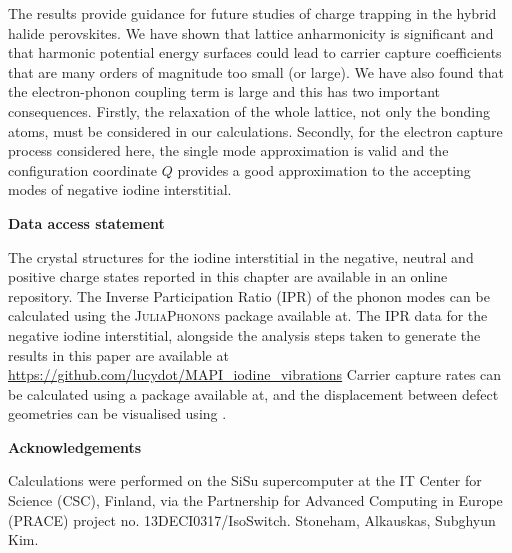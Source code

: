 The results provide guidance for future studies of charge trapping in the hybrid halide perovskites.
We have shown that lattice anharmonicity is significant and that harmonic potential energy surfaces could lead to carrier capture coefficients that are many orders of magnitude too small (or large).
We have also found that the electron-phonon coupling term is large and this has two important consequences. Firstly, the relaxation of the whole lattice, not only the bonding atoms, must be considered in our calculations.
Secondly, for the electron capture process considered here, the single mode approximation is valid and the configuration coordinate $Q$ provides a good approximation to the accepting modes of negative iodine interstitial.

\textbf{Data access statement}

The crystal structures for the iodine interstitial in the negative, neutral and positive charge states reported in this chapter are available 
in an online repository.\autocite{}
The Inverse Participation Ratio (IPR) of the phonon modes can be calculated using the \textsc{JuliaPhonons} package available at.
The IPR data for the negative iodine interstitial, alongside the analysis steps taken to generate the results in this paper are available at \url{https://github.com/lucydot/MAPI_iodine_vibrations}
Carrier capture rates can be calculated using a package available at,%
and the displacement between defect geometries can be visualised using .%

\textbf{Acknowledgements}

Calculations were performed on the SiSu supercomputer at the IT Center for Science (CSC), Finland, via the Partnership for Advanced Computing in Europe (PRACE) project no. 13DECI0317/IsoSwitch.
Stoneham, Alkauskas, Subghyun Kim.

